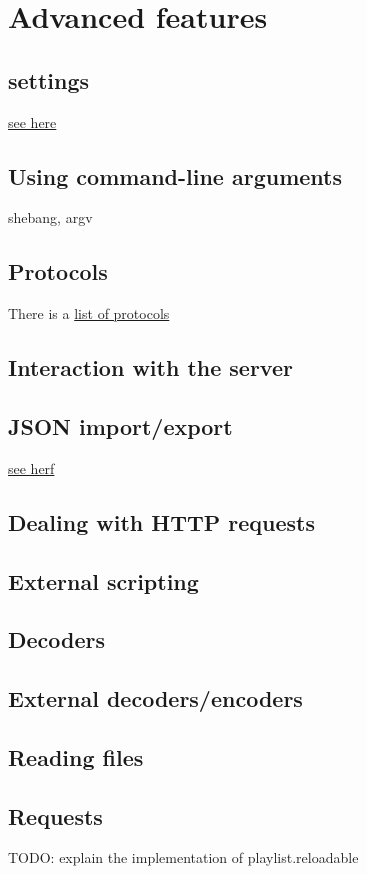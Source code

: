 \chapter{Advanced features}
\section{\Liquidsoap settings}
\href{https://www.liquidsoap.info/doc-dev/settings.html}{see here}

\section{Using command-line arguments}
shebang, argv

\section{Protocols}
There is a \href{https://www.liquidsoap.info/doc-dev/protocols.html}{list of protocols}

\section{Interaction with the server}

\section{JSON import/export}
\href{https://www.liquidsoap.info/doc-dev/json.html}{see herf}

\section{Dealing with HTTP requests}

\section{External scripting}

\section{Decoders}

\section{External decoders/encoders}

\section{Reading files}

\section{Requests}
TODO: explain the implementation of playlist.reloadable